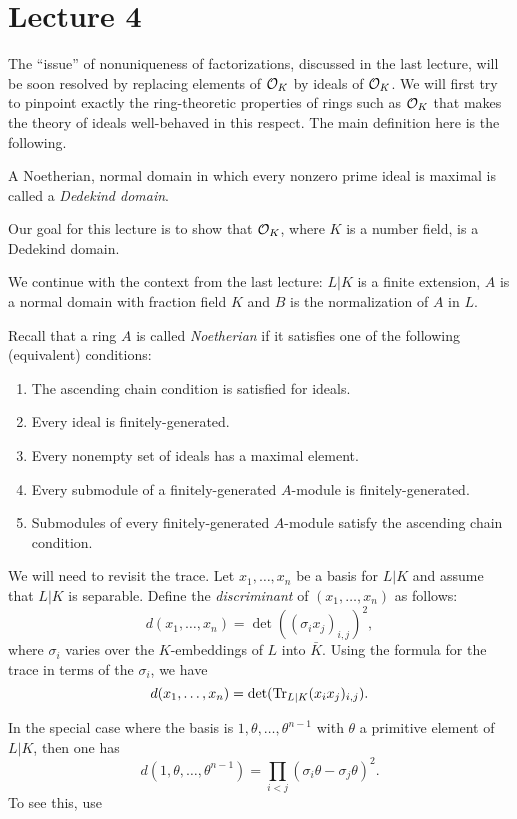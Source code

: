\section{Lecture 4}

The ``issue'' of nonuniqueness of factorizations, discussed in the last lecture, will be soon resolved by replacing elements of $\mathcal{O}_{K}$ by ideals of $\mathcal{O}_{K}$.
We will first try to pinpoint exactly the ring-theoretic properties of rings such as $\mathcal{O}_{K}$ that makes the theory of ideals well-behaved in this respect.
The main definition here is the following.
\begin{definition}
  A Noetherian, normal domain in which every nonzero prime ideal is maximal is called a \emph{Dedekind domain}.
\end{definition}
Our goal for this lecture is to show that $\mathcal{O}_{K}$, where $K$ is a number field, is a Dedekind domain.

We continue with the context from the last lecture: $L|K$ is a finite extension, $A$ is a normal domain with fraction field $K$ and $B$ is the normalization of $A$ in $L$.

Recall that a ring $A$ is called \emph{Noetherian} if it satisfies one of the following (equivalent) conditions:
\begin{enumerate}
  \item The ascending chain condition is satisfied for ideals.
  \item Every ideal is finitely-generated.
  \item Every nonempty set of ideals has a maximal element.
  \item Every submodule of a finitely-generated $A$-module is finitely-generated.
  \item Submodules of every finitely-generated $A$-module satisfy the ascending chain condition.
\end{enumerate}

We will need to revisit the trace.
Let $x_{1},\ldots,x_{n}$ be a basis for $L|K$ and assume that $L|K$ is separable.
Define the \emph{discriminant} of $(x_{1},\ldots,x_{n})$ as follows:
\[ d(x_{1},\ldots,x_{n}) = \det((\sigma_{i}x_{j})_{i,j})^{2}, \]
where $\sigma_{i}$ varies over the $K$-embeddings of $L$ into $\bar K$.
Using the formula for the trace in terms of the $\sigma_{i}$, we have
\[ d(x_{1},\ldots,x_{n}) = \det(\operatorname{Tr}_{L|K}(x_{i}x_{j})_{i,j}). \]

In the special case where the basis is $1,\theta,\ldots,\theta^{n-1}$ with $\theta$ a primitive element of $L|K$, then one has
\[ d(1,\theta,\ldots,\theta^{n-1}) = \prod_{i<j} (\sigma_{i} \theta - \sigma_{j}\theta)^{2}. \]
To see this, use 

